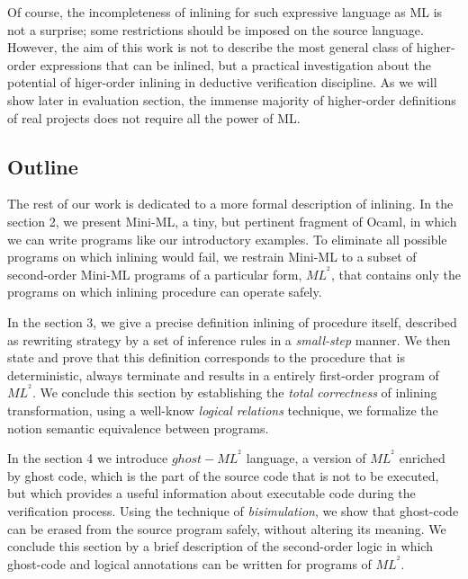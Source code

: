 \documentclass[a4paper,11pt,oneside]{article}
\theoremstyle{plain}
\newcommand{\inlsrc}{\textit{ML}^{^2}}
\begin{document}
Of course, the incompleteness of inlining for such expressive language as ML is
not a surprise; some restrictions should be imposed on the source language.  
	However, the aim of this work is not to describe the most general
class of higher-order expressions that can be inlined, but a 
practical investigation about the potential of higer-order inlining in deductive
verification discipline. As we will show later in evaluation section, the
immense majority of higher-order definitions of real projects does not require
all the power of ML.
% 
 
\subsection*{Outline}	
		The rest of our work is dedicated to a more formal description of inlining. 
	In the section 2, we present Mini-ML, a tiny, but pertinent fragment of Ocaml, in which we can write programs like our introductory examples. 
	To eliminate all possible programs on which inlining would fail, we restrain Mini-ML to a subset of second-order Mini-ML programs of a particular form, $\inlsrc$, that contains only the programs on which inlining procedure can operate safely. 

	In the section 3, we give a precise definition inlining of procedure itself, described as rewriting strategy by a set of inference rules in a \textit{small-step} manner.
 We then state and prove that this definition corresponds to the procedure 
that is deterministic, always terminate and results in a entirely first-order
program of $\inlsrc$.
 We conclude this section by establishing the \textit{total correctness} of inlining
transformation, using a well-know \textit{logical relations} technique, we 
formalize the notion semantic equivalence between programs.

 In the section 4 we introduce $ghost-\inlsrc$ language, a version of $\inlsrc$ enriched by ghost code, which is the part of the source code that is not to be executed, but which provides a useful information about executable code during the verification process.
 Using the technique of \textit{bisimulation}, we show that ghost-code can be erased from the source program safely, without altering its meaning.  
	We conclude this section by a brief description of the second-order logic in which  ghost-code and logical annotations can be written for programs of  $\inlsrc$.
\end{document}

